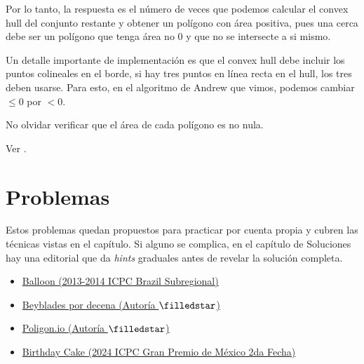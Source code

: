 Por lo tanto, la respuesta es el número de veces que podemos calcular el convex hull del conjunto restante y obtener un polígono con área positiva, pues una cerca debe ser un polígono que tenga área no $0$ y que no se intersecte a si mismo.

Un detalle importante de implementación es que el convex hull debe incluir los puntos colineales en el borde, si hay tres puntos en línea recta en el hull, los tres deben usarse. Para esto, en el algoritmo de Andrew que vimos, podemos cambiar $\leq 0$ por $< 0$.

No olvidar verificar que el área de cada polígono es no nula.

Ver .
\section{Problemas}

Estos problemas quedan propuestos para practicar por cuenta propia y cubren las técnicas vistas en el capítulo. Si alguno se complica, en el capítulo de Soluciones hay una editorial que da \textit{hints} graduales antes de revelar la solución completa.

\begin{itemize}
  \item[8.7.1] \href{https://codeforces.com/gym/101473}{Balloon (2013-2014 ICPC Brazil Subregional)}
  \item[8.7.2] \href{https://codeforces.com/group/DH4HPwQlLU/contest/689800/problem/G}{Beyblades por decena (Autoría $\filledstar$)}
  \item[8.7.3] \href{https://codeforces.com/group/DH4HPwQlLU/contest/689800/problem/H}{Poligon.io (Autoría $\filledstar$)}
  \item[8.7.4] \href{https://codeforces.com/gym/105216/problem/B}{Birthday Cake (2024 ICPC Gran Premio de México 2da Fecha)}
\end{itemize}